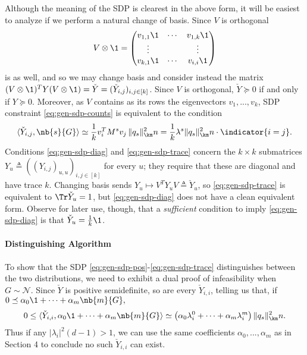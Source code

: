 Although the meaning of the SDP is clearest in the above form, it will be easiest to analyze if we perform a natural change of basis. Since $V$ is orthogonal
$$
    V \otimes \1 = \begin{pmatrix} v_{1,1}\1 & \cdots & v_{1,k}\1 \\ \vdots & & \vdots \\ v_{k,1}\1 & \cdots & v_{i,i}\1 \end{pmatrix}
$$
is as well, and so we may change basis and consider instead the matrix $(V \otimes \1)^T Y (V\otimes \1) = \check Y = (\check Y_{i,j})_{i,j \in [k]}$. Since $V$ is orthogonal, $\check Y \succeq 0$ if and only if $Y \succeq 0$. Moreover, as $V$ contains as its rows the eigenvectors $v_1,...,v_k$, SDP constraint \eqref{eq:gen-sdp-counts} is equivalent to the condition
\begin{equation} \label{eq:Y-check-cond}
    \langle \check Y_{i,j}, \nb{s}{G} \rangle \simeq \frac{1}{k} v_i^T M^s v_j \, \|q_s\|^2_{\km} n = \frac{1}{k}\lambda^s\|q_s\|^2_{\km} n \cdot \indicator{i=j}.
\end{equation}
Conditions \eqref{eq:gen-sdp-diag} and \eqref{eq:gen-sdp-trace} concern the $k\times k$ submatrices $Y_u \triangleq ((Y_{i,j})_{u,u})_{i,j\in[k]}$ for every $u$; they require that these are diagonal and have trace $k$. Changing basis sends $Y_u \mapsto V^T Y_u V \triangleq \check Y_u$, so \eqref{eq:gen-sdp-trace} is equivalent to $\Tr \check Y_u = 1$, but \eqref{eq:gen-sdp-diag} does not have a clean equivalent form. Observe for later use, though, that a \emph{sufficient} condition to imply \eqref{eq:gen-sdp-diag} is that $\check Y_u = \tfrac{1}{k}\1$.

\paragraph{Distinguishing Algorithm}
To show that the SDP \eqref{eq:gen-sdp-pos}-\eqref{eq:gen-sdp-trace} distinguishes between the two distributions, we need to exhibit a dual proof of infeasibility when $G \sim \mathcal{N}$.
%
%
Since $\check Y$ is positive semidefinite, so are every $\check Y_{i,i}$, telling us that, if $0 \preceq \alpha_0 \1 + \cdots + \alpha_m \nb{m}{G},$
$$
    0 \le \langle \check Y_{i,i}, \alpha_0 \1 + \cdots + \alpha_m \nb{m}{G} \rangle \simeq \left(\alpha_0\lambda_i^0 + \cdots + \alpha_m \lambda_i^m\right) \|q_s\|^2_{\km} n.
$$
Thus if any $|\lambda_i|^2(d-1) > 1$, we can use the same coefficients $\alpha_0,...,\alpha_m$ as in Section 4 to conclude no such $\check Y_{i,i}$ can exist.

